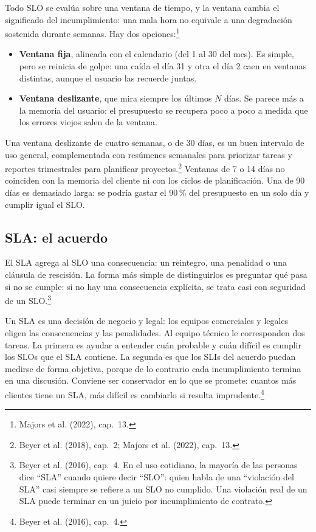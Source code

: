 \documentclass[variant=apuntes,cover=institutional,mode=screen]{ua-engineering-v6-article}
\begin{document}
Todo SLO se evalúa sobre una ventana de tiempo, y la ventana cambia el significado del incumplimiento: una mala hora no equivale a una degradación sostenida durante semanas. Hay dos opciones:\footnote{Majors et al. (2022), cap.~13.}
\begin{itemize}
\item \textbf{Ventana fija}, alineada con el calendario (del 1 al 30 del mes). Es simple, pero se reinicia de golpe: una caída el día 31 y otra el día 2 caen en ventanas distintas, aunque el usuario las recuerde juntas.
\item \textbf{Ventana deslizante}, que mira siempre los últimos $N$ días. Se parece más a la memoria del usuario: el presupuesto se recupera poco a poco a medida que los errores viejos salen de la ventana.
\end{itemize}
Una ventana deslizante de cuatro semanas, o de 30 días, es un buen intervalo de uso general, complementada con resúmenes semanales para priorizar tareas y reportes trimestrales para planificar proyectos.\footnote{Beyer et al. (2018), cap.~2; Majors et al. (2022), cap.~13.} Ventanas de 7 o 14 días no coinciden con la memoria del cliente ni con los ciclos de planificación. Una de 90 días es demasiado larga: se podría gastar el 90\,\% del presupuesto en un solo día y cumplir igual el SLO.

\subsection{SLA: el acuerdo}\label{sec:sla}

El SLA agrega al SLO una consecuencia: un reintegro, una penalidad o una cláusula de rescisión. La forma más simple de distinguirlos es preguntar qué pasa si no se cumple: si no hay una consecuencia explícita, se trata casi con seguridad de un SLO.\footnote{Beyer et al. (2016), cap.~4. En el uso cotidiano, la mayoría de las personas dice ``SLA'' cuando quiere decir ``SLO'': quien habla de una ``violación del SLA'' casi siempre se refiere a un SLO no cumplido. Una violación real de un SLA puede terminar en un juicio por incumplimiento de contrato.}

Un SLA es una decisión de negocio y legal: los equipos comerciales y legales eligen las consecuencias y las penalidades. Al equipo técnico le corresponden dos tareas. La primera es ayudar a entender cuán probable y cuán difícil es cumplir los SLOs que el SLA contiene. La segunda es que los SLIs del acuerdo puedan medirse de forma objetiva, porque de lo contrario cada incumplimiento termina en una discusión. Conviene ser conservador en lo que se promete: cuantos más clientes tiene un SLA, más difícil es cambiarlo si resulta imprudente.\footnote{Beyer et al. (2016), cap.~4.}
\end{document}
